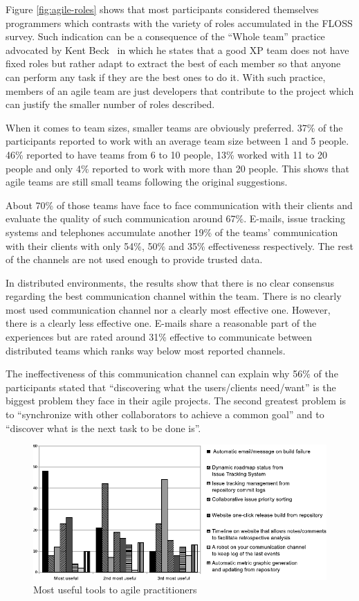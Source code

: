 \documentclass[lnbip]{svmultln}
\begin{document}
Figure \ref{fig:agile-roles} shows that most participants considered
themselves programmers which contrasts with the variety of roles
accumulated in the FLOSS survey. Such indication can be a consequence
of the ``Whole team'' practice advocated by Kent Beck~\cite{beck2004}
in which he states that a good XP team does not have fixed roles but
rather adapt to extract the best of each member so that anyone can
perform any task if they are the best ones to do it. With such
practice, members of an agile team are just developers that contribute
to the project which can justify the smaller number of roles
described.

When it comes to team sizes, smaller teams are obviously
preferred. 37\% of the participants reported to work with an average
team size between 1 and 5 people. 46\% reported to have teams from 6
to 10 people, 13\% worked with 11 to 20 people and only 4\% reported
to work with more than 20 people. This shows that agile teams are
still small teams following the original suggestions.

About 70\% of those teams have face to face communication with their
clients and evaluate the quality of such communication around
67\%. E-mails, issue tracking systems and telephones accumulate
another 19\% of the teams' communication with their clients with only
54\%, 50\% and 35\% effectiveness respectively. The rest of the
channels are not used enough to provide trusted data.

In distributed environments, the results show that there is no clear
consensus regarding the best communication channel within the
team. There is no clearly most used communication channel nor a
clearly most effective one. However, there is a clearly less effective
one. E-mails share a reasonable part of the experiences but are rated
around 31\% effective to communicate between distributed teams which
ranks way below most reported channels.

The ineffectiveness of this communication channel can explain why 56\%
of the participants stated that ``discovering what the users/clients
need/want'' is the biggest problem they face in their agile
projects. The second greatest problem is to ``synchronize with other
collaborators to achieve a common goal'' and to ``discover what is the
next task to be done is''.

\begin{figure}[hbt]
  \centering
  \includegraphics[scale=.8]{agile-tools.pdf}
  \caption{Most useful tools to agile practitioners}
  \label{fig:agile-tools}
\end{figure}
\end{document}
